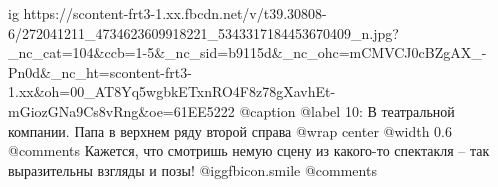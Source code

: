  
 
 
 
 

\ifcmt
  ig https://scontent-frt3-1.xx.fbcdn.net/v/t39.30808-6/272041211_4734623609918221_5343317184453670409_n.jpg?_nc_cat=104&ccb=1-5&_nc_sid=b9115d&_nc_ohc=mCMVCJ0cBZgAX_-Pn0d&_nc_ht=scontent-frt3-1.xx&oh=00_AT8Yq5wgbkETxnRO4F8z78gXavhEt-mGiozGNa9Cs8vRng&oe=61EE5222
  @caption @label 10: В театральной компании. Папа в верхнем ряду второй справа
	@wrap center
	@width 0.6
	@comments%
Кажется, что смотришь немую сцену из какого-то спектакля – так выразительны взгляды и позы!  @igg{fbicon.smile} 
	@comments%
\fi
